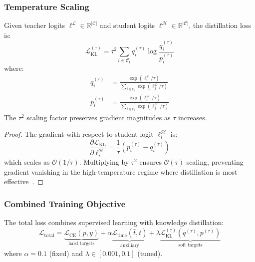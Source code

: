 \subsubsection{Temperature Scaling}

\begin{theorem}
    \label{thm:temp-scaling}
    Given teacher logits $\boldsymbol{\ell}^{\mathcal{L}} \in \mathbb{R}^{|\mathcal{C}|}$ and student logits $\boldsymbol{\ell}^{\mathcal{H}} \in \mathbb{R}^{|\mathcal{C}|}$, the distillation loss is:
    \begin{equation}
        \mathcal{L}_{\text{KL}}^{(\tau)} = \tau^2 \sum_{i \in \mathcal{C}_t} q_i^{(\tau)} \log \frac{q_i^{(\tau)}}{p_i^{(\tau)}}
        \label{eq:distill-loss}
    \end{equation}
    where:
    \begin{align}
        q_i^{(\tau)} & = \frac{\exp(\ell_i^{\mathcal{L}} / \tau)}{\sum_{j \in \mathcal{C}_t} \exp(\ell_j^{\mathcal{L}} / \tau)} \label{eq:teacher-dist} \\
        p_i^{(\tau)} & = \frac{\exp(\ell_i^{\mathcal{H}} / \tau)}{\sum_{j \in \mathcal{C}_t} \exp(\ell_j^{\mathcal{H}} / \tau)} \label{eq:student-dist}
    \end{align}
    The $\tau^2$ scaling factor preserves gradient magnitudes as $\tau$ increases.
\end{theorem}

\begin{proof}
    The gradient with respect to student logit $\ell_i^{\mathcal{H}}$ is:
    \begin{equation}
        \frac{\partial \mathcal{L}_{\text{KL}}}{\partial \ell_i^{\mathcal{H}}} = \frac{1}{\tau}(p_i^{(\tau)} - q_i^{(\tau)})
    \end{equation}
    which scales as $\mathcal{O}(1/\tau)$. Multiplying by $\tau^2$ ensures $\mathcal{O}(\tau)$ scaling, preventing gradient vanishing in the high-temperature regime where distillation is most effective~\cite{hintonDistillingKnowledgeNeural2015}.
\end{proof}

\subsubsection{Combined Training Objective}

The total loss combines supervised learning with knowledge distillation:
\begin{equation}
    \mathcal{L}_{\text{total}} = \underbrace{\mathcal{L}_{\text{CE}}(p, y)}_{\text{hard targets}} +
    \alpha \underbrace{\mathcal{L}_{\text{time}}(\hat{t}, t)}_{\text{auxiliary}} +
    \lambda \underbrace{\mathcal{L}_{\text{KL}}^{(\tau)}(q^{(\tau)}, p^{(\tau)})}_{\text{soft targets}}
    \label{eq:total-loss}
\end{equation}
where $\alpha = 0.1$ (fixed) and $\lambda \in [0.001, 0.1]$ (tuned).

